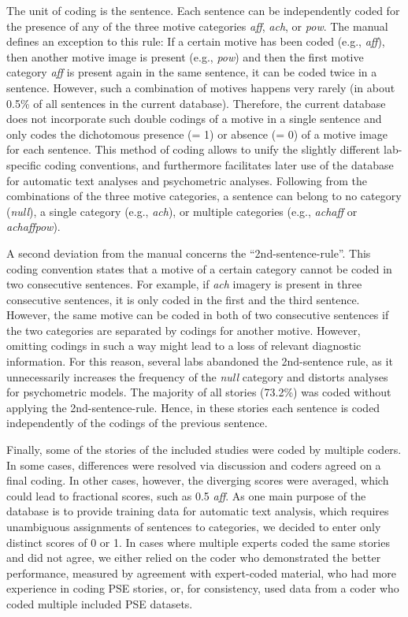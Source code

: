 \documentclass[man,a4paper,mask]{apa6}\usepackage[]{graphicx}\usepackage[]{color}
\begin{document}
The unit of coding is the sentence. Each sentence can be independently coded for the presence of any of the three motive categories \emph{aff}, \emph{ach}, or \emph{pow}. The manual defines an exception to this rule: If a certain motive has been coded (e.g., \emph{aff}), then another motive image is present (e.g., \emph{pow}) and then the first motive category \emph{aff} is present again in the same sentence, it can be coded twice in a sentence. However, such a combination of motives happens very rarely (in about 0.5\% of all sentences in the current database). Therefore, the current database does not incorporate such double codings of a motive in a single sentence and only codes the dichotomous presence (= 1) or absence (= 0) of a motive image for each sentence. This method of coding allows to unify the slightly different lab-specific coding conventions, and furthermore facilitates later use of the database for automatic text analyses and psychometric analyses. 
Following from the combinations of the three motive categories, a sentence can belong to no category (\emph{null}), a single category (e.g., \emph{ach}), or multiple categories (e.g., \emph{achaff} or \emph{achaffpow}).

A second deviation from the manual concerns the ``2nd-sentence-rule''. This coding convention states that a motive of a certain category cannot be coded in two consecutive sentences. For example, if \emph{ach} imagery is present in three consecutive sentences, it is only coded in the first and the third sentence. However, the same motive can be coded in both of two consecutive sentences if the two categories are separated by codings for another motive. 
However, omitting codings in such a way might lead to a loss of relevant diagnostic information. For this reason, several labs abandoned the 2nd-sentence rule, as it unnecessarily increases the frequency of the \emph{null} category and distorts analyses for psychometric models. The majority of all stories (73.2\%) was coded without applying the 2nd-sentence-rule. Hence, in these stories each sentence is coded independently of the codings of the previous sentence.

Finally, some of the stories of the included studies were coded by multiple coders. In some cases, differences were resolved via discussion and coders agreed on a final coding. In other cases, however, the diverging scores were averaged, which could lead to fractional scores, such as 0.5 \emph{aff}. As one main purpose of the database is to provide training data for automatic text analysis, which requires unambiguous assignments of sentences to categories, we decided to enter only distinct scores of 0 or 1. In cases where multiple experts coded the same stories and did not agree, we either relied on the coder who demonstrated the better performance, measured by agreement with expert-coded material, who had more experience in coding PSE stories, or, for consistency, used data from a coder who coded multiple included PSE datasets.
\end{document}
